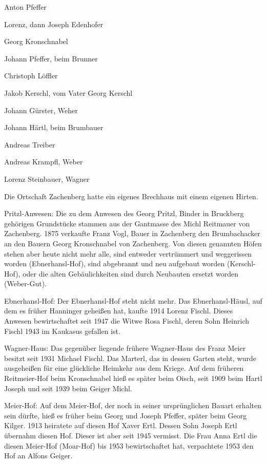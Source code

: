 Anton Pfeffer

Lorenz, dann Joseph Edenhofer

Georg Kronschnabel

Johann Pfeffer, beim Brunner

Christoph Löffler

Jakob Kerschl, vom Vater Georg Kerschl

Johann Gürster, Weher

Johann Härtl, beim Brumbauer

Andreas Treiber

Andreas Krampfl, Weber

Lorenz Steinbauer, Wagner



Die Ortschaft Zachenberg hatte ein eigenes Brechhaus mit einem eigenen Hirten.

Pritzl-Anwesen: Die zu dem Anwesen des Georg Pritzl, Binder in Bruckberg
gehörigen Grundstücke stammen aus der Gantmasse des Michl Reitmauer von
Zachenberg. 1875 verkaufte Franz Vogl, Bauer in Zachenberg den Brumbachacker an
den Bauern Georg Kronschnabel von Zachenberg. Von diesen genannten Höfen stehen
aber heute nicht mehr alle, sind entweder vertrümmert und weggerissen worden
(Ebnerhansl-Hof), sind abgebrannt und neu aufgebaut worden (Kerschl-Hof), oder
die alten Gebäulichkeiten sind durch Neubauten ersetzt worden (Weber-Gut).

Ebnerhansl-Hof: Der Ebnerhansl-Hof steht nicht mehr. Das Ebnerhansl-Häusl, auf
dem es früher Hanninger geheißen hat, kaufte 1914 Lorenz Fischl. Dieses Anwesen
bewirtschaftet seit 1947 die Witwe Rosa Fischl, deren Sohn Heinrich Fischl 1943
im Kaukasus gefallen ist.

Wagner-Haus: Das gegenüber liegende frühere Wagner-Haus des Franz Meier besitzt
seit 1931 Michael Fischl. Das Marterl, das in dessen Garten steht, wurde
ausgeheißen für eine glückliche Heimkehr aus dem Kriege. Auf dem früheren
Reitmeier-Hof beim Kronschnabel hieß es später beim Oisch, seit 1909 beim Hartl
Joseph und seit 1939 beim Geiger Michl.

Meier-Hof: Auf dem Meier-Hof, der noch in seiner ursprünglichen Bauart erhalten
sein dürfte, hieß es früher beim Georg und Joseph Pfeffer, später beim Georg
Kilger. 1913 heiratete auf diesen Hof Xaver Ertl. Dessen Sohn Joseph Ertl
übernahm diesen Hof. Dieser ist aber seit 1945 vermisst. Die Frau Anna Ertl die
diesen Meier-Hof (Moar-Hof) bis 1953 bewirtschaftet hat, verpachtete 1953 den
Hof an Alfons Geiger.

